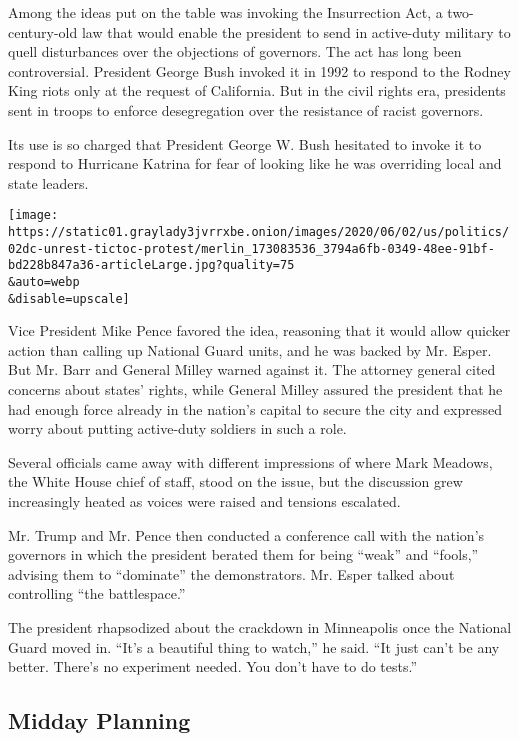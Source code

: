 Among the ideas put on the table was invoking the Insurrection Act, a
two-century-old law that would enable the president to send in
active-duty military to quell disturbances over the objections of
governors. The act has long been controversial. President George Bush
invoked it in 1992 to respond to the Rodney King riots only at the
request of California. But in the civil rights era, presidents sent in
troops to enforce desegregation over the resistance of racist governors.

Its use is so charged that President George W. Bush hesitated to invoke
it to respond to Hurricane Katrina for fear of looking like he was
overriding local and state leaders.

\texttt{[image: https://static01.graylady3jvrrxbe.onion/images/2020/06/02/us/politics/02dc-unrest-tictoc-protest/merlin\_173083536\_3794a6fb-0349-48ee-91bf-bd228b847a36-articleLarge.jpg?quality=75\\\&auto=webp\\\&disable=upscale]}

Vice President Mike Pence favored the idea, reasoning that it would
allow quicker action than calling up National Guard units, and he was
backed by Mr. Esper. But Mr. Barr and General Milley warned against it.
The attorney general cited concerns about states' rights, while General
Milley assured the president that he had enough force already in the
nation's capital to secure the city and expressed worry about putting
active-duty soldiers in such a role.

Several officials came away with different impressions of where Mark
Meadows, the White House chief of staff, stood on the issue, but the
discussion grew increasingly heated as voices were raised and tensions
escalated.

Mr. Trump and Mr. Pence then conducted a conference call with the
nation's governors in which the president berated them for being
``weak'' and ``fools,'' advising them to ``dominate'' the demonstrators.
Mr. Esper talked about controlling ``the battlespace.''

The president rhapsodized about the crackdown in Minneapolis once the
National Guard moved in. ``It's a beautiful thing to watch,'' he said.
``It just can't be any better. There's no experiment needed. You don't
have to do tests.''

\hypertarget{midday-planning}{%
\subsection{Midday Planning}\label{midday-planning}}


